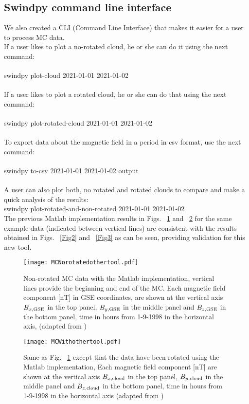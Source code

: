 \documentclass[baaa]{baaa}
\begin{document}
\subsection{Swindpy command line interface}
We also created a CLI (Command Line Interface) that makes it easier for a user to
process MC data.\\
If a user likes to plot a no-rotated cloud, he or she can do it using the next command:\\
\\
swindpy plot-cloud 2021-01-01 2021-01-02\\
\\
If a user likes to plot a rotated cloud, he or she can do that using the next command:\\
\\
swindpy plot-rotated-cloud 2021-01-01 2021-01-02\\
\\
To export data about the magnetic field in a period in csv format, use the next command:\\
\\
swindpy to-csv 2021-01-01 2021-01-02 output\\
\\
A user can also plot both, no rotated and rotated clouds to compare and make a quick analysis of  the results:\\
swindpy plot-rotated-and-non-rotated 2021-01-01 2021-01-02\\
The previous Matlab implementation results in Figs. ~\ref{Fig4} and ~\ref{Fig5} for the same example data (indicated between vertical lines) are consistent with the results obtained in Figs. ~\ref{Fig2} and ~\ref{Fig3} as can be seen, providing validation for this new tool.
\begin{figure}[!t]
\centering
\texttt{[image: MCNorotatedothertool.pdf]}
\caption{Non-rotated MC data with the Matlab implementation, vertical lines provide the beginning and end of the MC. Each magnetic field component [nT] in GSE coordinates, are shown at the vertical axis $B_{x, \rm GSE}$ in the top panel, $B_{y, \rm GSE}$ in the middle panel and $B_{z, \rm GSE}$ in the bottom panel, time in hours from 1-9-1998 in the horizontal axis, (adapted from \citealp{Gulisano2004})}
\label{Fig4}
\end{figure}
\begin{figure}[!t]
\centering
\texttt{[image: MCWithothertool.pdf]}
\caption{Same as Fig. ~\ref{Fig4} except that the data have been rotated using the Matlab implementation, Each magnetic field component [nT] are shown at the vertical axis $B_{x, \rm cloud}$ in the top panel, $B_{y, \rm cloud}$ in the middle panel and $B_{z, \rm cloud}$ in the bottom panel, time in hours from 1-9-1998 in the horizontal axis (adapted from \citealp{Gulisano2004})}
\label{Fig5}
\end{figure}
\end{document}
